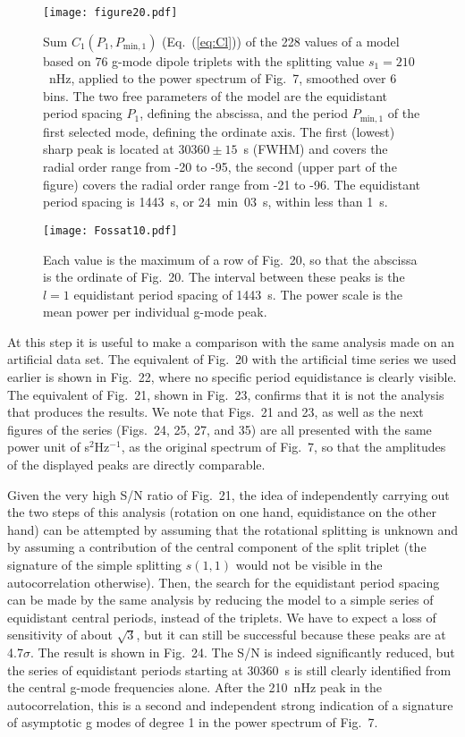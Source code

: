\documentclass[bibyear]{aa}
\begin{document}
\begin{figure}
\centering
\texttt{[image: figure20.pdf]}
\caption{Sum $C_1(P_1,P_{\mathrm{min},1})$ (Eq.~(\ref{eq:Cl})) of the 228 values of  a model based on 76 g-mode dipole triplets with the splitting value $s_1=210$~nHz, applied to the power spectrum of Fig.~7, smoothed over 6 bins. The two free parameters of the model are the equidistant period spacing $P_1$, defining the abscissa, and the period $P_{\mathrm{min},1}$ of the first selected mode, defining the ordinate axis. The first (lowest) sharp peak is located at $30360\pm 15$~s (FWHM) and covers the radial order range from -20 to -95, the second (upper part of the figure) covers the radial order range from -21 to -96. The equidistant period spacing is 1443~s, or 24~min~03~s,  within less than 1~s.}
\label{fig:C1}
\end{figure} 
 
\begin{figure}
\centering
\texttt{[image: Fossat10.pdf]}
\caption{Each value is the maximum of a row of Fig.~20, so that the abscissa is the ordinate of Fig.~20. The interval between these peaks is the $l=1$ equidistant period spacing of 1443~s. The power scale is the mean power per individual g-mode peak.}
\label{fig:max_row_C1}
\end{figure} 

At this step it is useful to make a comparison with the same analysis made on an artificial data set. The equivalent of Fig.~20 with the artificial time series we used earlier is shown in Fig.~22, where no specific period equidistance is clearly visible. The equivalent of Fig.~21, shown in Fig.~23, confirms  that it is not the analysis that produces the results. 
We note that Figs.~21 and 23, as well as the next figures of the series (Figs.~24, 25, 27, and 35) are all presented with the same power unit of s$^2$Hz$^{-1}$, as the original spectrum of Fig.~7, so that the amplitudes of the displayed peaks are directly comparable. 

Given the very high S/N ratio of Fig.~21, the idea  of  independently
carrying out the two steps of this analysis (rotation on one hand, equidistance on the other hand)  can be attempted by assuming that the rotational splitting is unknown and by assuming a contribution of the central component of the split triplet (the signature of the simple splitting $s(1,1)$ would not be visible in the autocorrelation otherwise). Then, the search for the equidistant period spacing can be made by the same analysis by reducing the model to a simple series of equidistant central periods, instead of the triplets. We have to expect a loss of sensitivity of about  $\sqrt3$, but it can still be successful because these peaks are at 4.7$\sigma$. The result is shown in Fig.~24. The S/N is indeed significantly reduced, but the series of equidistant periods starting at 30360~s is still clearly identified from the central g-mode frequencies alone. 
After the 210~nHz peak in the autocorrelation, this is a second and independent strong indication of a signature of asymptotic g modes of degree 1 in the power spectrum of Fig.~7. 
\end{document}
